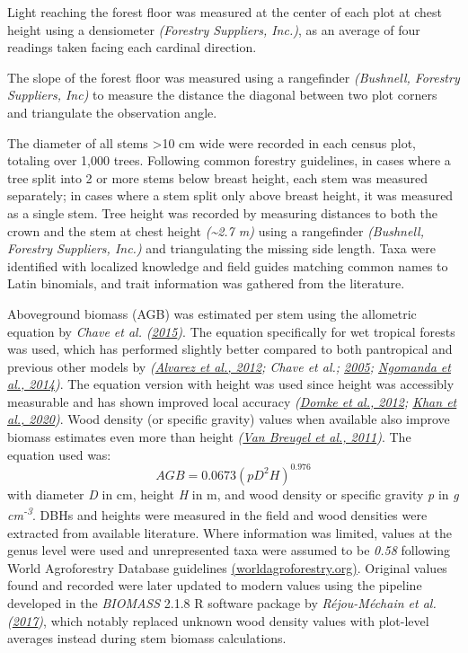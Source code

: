 \documentclass[
  12pt,
]{article}
\begin{document}
Light reaching the forest floor was measured at the center of each plot at chest height using a densiometer \emph{(Forestry Suppliers, Inc.)}, as an average of four readings taken facing each cardinal direction.

The slope of the forest floor was measured using a rangefinder \emph{(Bushnell, Forestry Suppliers, Inc)} to measure the distance the diagonal between two plot corners and triangulate the observation angle.

The diameter of all stems \textgreater10 cm wide were recorded in each census plot, totaling over 1,000 trees.
Following common forestry guidelines, in cases where a tree split into 2 or more stems below breast height, each stem was measured separately; in cases where a stem split only above breast height, it was measured as a single stem.
Tree height was recorded by measuring distances to both the crown and the stem at chest height \emph{(\textasciitilde2.7 m)} using a rangefinder \emph{(Bushnell, Forestry Suppliers, Inc.)} and triangulating the missing side length.
Taxa were identified with localized knowledge and field guides matching common names to Latin binomials,
and trait information was gathered from the literature.

Aboveground biomass (AGB) was estimated per stem using the allometric equation by \emph{Chave et al. (\protect\hyperlink{ref-chave15}{2015})}.
The equation specifically for wet tropical forests was used, which has performed slightly better compared to both pantropical and previous other models by \emph{(\protect\hyperlink{ref-alvarez12}{Alvarez et al., 2012}; Chave et al.; \protect\hyperlink{ref-chave05}{2005}; \protect\hyperlink{ref-ngomanda14}{Ngomanda et al., 2014})}.
The equation version with height was used since height was accessibly measurable and has shown improved local accuracy \emph{(\protect\hyperlink{ref-domke12}{Domke et al., 2012}; \protect\hyperlink{ref-khan20}{Khan et al., 2020})}.
Wood density (or specific gravity) values when available also improve biomass estimates even more than height \emph{(\protect\hyperlink{ref-vanbreugel11}{Van Breugel et al., 2011})}.
The equation used was:
\[{AGB} = 0.0673 (p D^2 H)^{0.976}\]
with diameter \emph{D} in cm, height \emph{H} in m, and wood density or specific gravity \emph{p} in \emph{g cm\textsuperscript{-3}}.
DBHs and heights were measured in the field and wood densities were extracted from available literature.
Where information was limited, values at the genus level were used and unrepresented taxa were assumed to be \emph{0.58} following World Agroforestry Database guidelines \href{worldagroforestry.org}{(worldagroforestry.org)}.
Original values found and recorded were later updated to modern values using the pipeline developed in the \emph{BIOMASS} 2.1.8 R software package by \emph{Réjou-Méchain et al. (\protect\hyperlink{ref-rejou-mechain17}{2017})}, which notably replaced unknown wood density values with plot-level averages instead during stem biomass calculations.
\end{document}

